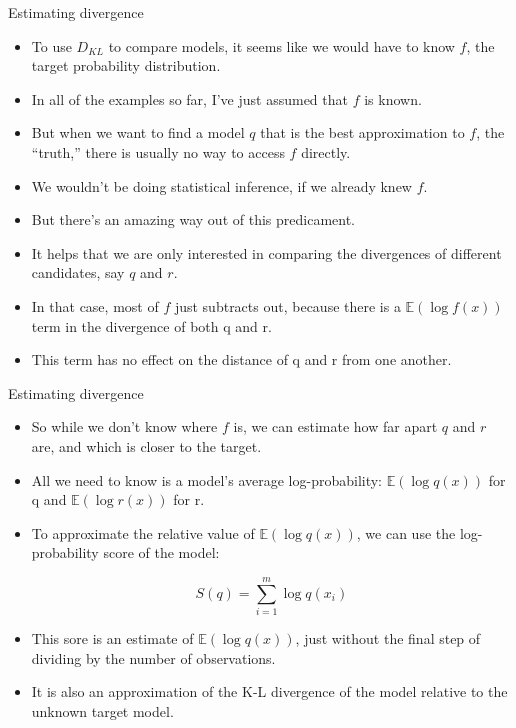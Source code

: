 \documentclass[handout]{beamer}
\begin{document}
\begin{frame}{Estimating divergence}
\scriptsize{

\begin{itemize}

\item  To use $D_{KL}$ to compare models, it seems like we would have to know $f$, the target probability distribution.
\item In all of the examples so far, I've just assumed that $f$ is known.
\item But when we want to find a model $q$ that is the best approximation to $f$, the ``truth,'' there is usually no way to access $f$ directly.
\item We wouldn't be doing statistical inference, if we already knew $f$.

\item But there's an amazing way out of this predicament. 
\item It helps that we are only interested in comparing the divergences of different candidates, say $q$ and $r$. 
\item In that case, most of $f$ just subtracts out, because there is a $\mathbb{E}(\log f(x))$ term in the divergence of both q and r.
\item This term has no effect on the distance of q and r from one another. 

\end{itemize}


} 
\end{frame}


\begin{frame}{Estimating divergence}
\scriptsize{

\begin{itemize}

\item So while we don't know where $f$ is, we can estimate how far apart $q$ and $r$ are, and which is closer to the target.


\item All we need to know is a model's average log-probability: $\mathbb{E}(\log q(x))$ for q and $\mathbb{E}(\log r(x))$ for r. 



\item To approximate the relative value of $\mathbb{E}(\log q(x))$, we can use the log-probability score of the model:

\begin{equation}
S(q) = \sum_{i=1}^m \log q(x_i)
\end{equation}


\item This sore is an estimate of $\mathbb{E}(\log q(x))$, just without the final step of dividing by the number of observations.

\item It is also an approximation of the K-L divergence of the model relative to the unknown target model. 


\end{itemize}


} 
\end{frame}
\end{document}
